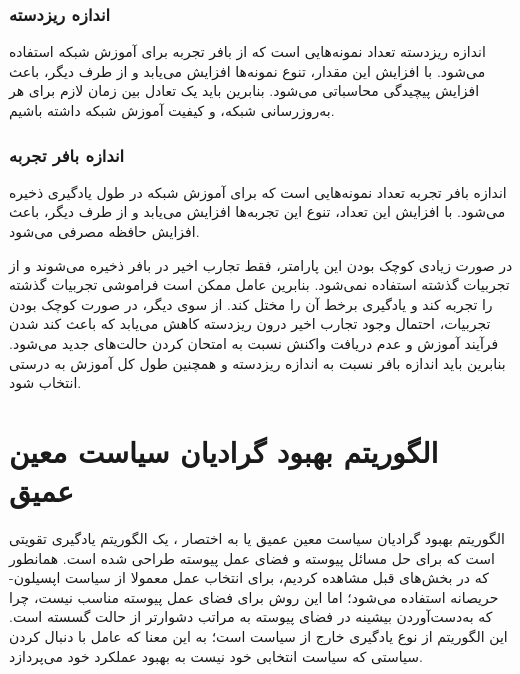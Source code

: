 \subsubsection{اندازه ریزدسته}
اندازه ریزدسته تعداد نمونه‌هایی است که از بافر تجربه برای آموزش شبکه استفاده می‌شود.
با افزایش این مقدار، تنوع نمونه‌ها افزایش می‌یابد و از طرف دیگر، باعث افزایش پیچیدگی محاسباتی می‌شود.
بنابرین باید یک تعادل بین زمان لازم برای هر به‌روز‌رسانی شبکه، و کیفیت آموزش شبکه داشته باشیم.
\subsubsection{اندازه بافر تجربه}
اندازه بافر تجربه تعداد نمونه‌هایی است که برای آموزش شبکه در طول یادگیری ذخیره می‌شود.
با افزایش این تعداد، تنوع این تجربه‌ها افزایش می‌یابد و از طرف دیگر، باعث افزایش حافظه مصرفی می‌شود.

در صورت زیادی کوچک بودن این پارامتر، فقط تجارب اخیر در بافر ذخیره می‌شوند و از تجربیات گذشته استفاده نمی‌شود.
بنابرین عامل ممکن است فراموشی تجربیات گذشته را تجربه کند و یادگیری برخط آن را مختل کند\cite{zhang2017deeper}.
از سوی دیگر، در صورت کوچک بودن تجربیات، احتمال وجود تجارب اخیر درون ریزدسته کاهش می‌یابد که باعث کند شدن فرآیند آموزش و عدم دریافت واکنش نسبت به امتحان کردن حالت‌های جدید می‌شود\cite{mnih2015human}.
بنابرین باید اندازه بافر نسبت به اندازه ریزدسته و همچنین طول کل آموزش به درستی انتخاب شود.  
\section{الگوریتم بهبود گرادیان سیاست معین عمیق}
الگوریتم بهبود گرادیان سیاست معین عمیق یا به اختصار ، یک الگوریتم یادگیری تقویتی است که برای حل مسائل پیوسته و فضای عمل پیوسته طراحی شده است\cite{lillicrap2015continuous}.
همانطور که در بخش‌های قبل مشاهده کردیم، برای انتخاب عمل معمولا از سیاست اپسیلون-حریصانه استفاده می‌شود؛ اما این روش برای فضای عمل پیوسته مناسب نیست، چرا که به‌دست‌آوردن بیشینه در فضای پیوسته به مراتب دشوار‌تر از حالت گسسته است.
این الگوریتم از نوع یادگیری خارج از سیاست است؛ به این معنا که عامل با دنبال کردن سیاستی که سیاست انتخابی خود نیست به بهبود عملکرد خود می‌پردازد.

